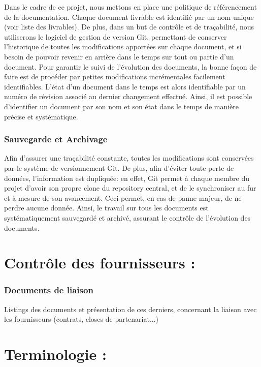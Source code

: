 \documentclass[a4paper, 18pt]{article}
\begin{document}
Dans le cadre de ce projet, nous mettons en place une politique de référencement de la documentation. Chaque document livrable est identifié par un nom unique (voir liste des livrables). De plus, dans un but de contrôle et de traçabilité, nous utiliserons le logiciel de gestion de version Git, permettant de conserver l'historique de toutes les modifications apportées sur chaque document, et si besoin de pouvoir revenir en arrière dans le temps sur tout ou partie d'un document. Pour garantir le suivi de l'évolution des documents, la bonne façon de faire est de procéder par petites modifications incrémentales facilement identifiables. L'état d'un document dans le temps est alors identifiable par un numéro de révision associé au dernier changement effectué. Ainsi, il est possible d'identifier un document par son nom et son état dans le temps de manière précise et systématique.

\section{Sauvegarde et Archivage}

Afin d'assurer une traçabilité constante, toutes les modifications sont conservées par le système de versionnement Git. De plus, afin d'éviter toute perte de données, l'information est dupliquée: en effet, Git permet à chaque membre du projet d'avoir son propre clone du repository central, et de le synchroniser au fur et à mesure de son avancement. Ceci permet, en cas de panne majeur, de ne perdre aucune donnée. Ainsi, le travail sur tous les documents est systématiquement sauvegardé et archivé, assurant le contrôle de l'évolution des documents.

\part{Contrôle des fournisseurs :}

\section{Documents de liaison}

Listings des documents et présentation de ces derniers, concernant la liaison avec les fournisseurs (contrats, closes de partenariat...)

\part{Terminologie :}
\end{document}
